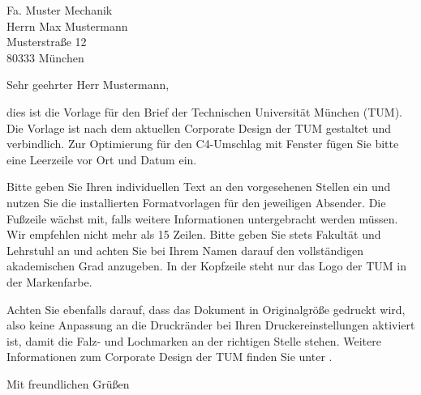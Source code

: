 \documentclass[german]{tumletter}
\begin{document}
\begin{letter}{Fa. Muster Mechanik\\Herrn Max Mustermann\\
    Musterstraße 12\\80333 München}

  \opening{Sehr geehrter Herr Mustermann,}
  \raggedright

  dies ist die Vorlage für den Brief der Technischen Universität München
  (TUM). Die Vorlage ist nach dem aktuellen Corporate Design der TUM gestaltet
  und verbindlich. Zur Optimierung für den C4-Umschlag mit Fenster fügen Sie
  bitte eine Leerzeile vor Ort und Datum ein.

  Bitte geben Sie Ihren individuellen Text an den vorgesehenen Stellen ein und
  nutzen Sie die installierten Formatvorlagen für den jeweiligen Absender. Die
  Fußzeile wächst mit, falls weitere Informationen untergebracht werden
  müssen. Wir empfehlen nicht mehr als 15 Zeilen. Bitte geben Sie stets
  Fakultät und Lehrstuhl an und achten Sie bei Ihrem Namen darauf den
  vollständigen akademischen Grad anzugeben. In der Kopfzeile steht nur das
  Logo der TUM in der Markenfarbe.

  Achten Sie ebenfalls darauf, dass das Dokument in Originalgröße gedruckt
  wird, also keine Anpassung an die Druckränder bei Ihren Druckereinstellungen
  aktiviert ist, damit die Falz- und Lochmarken an der richtigen Stelle
  stehen. Weitere Informationen zum Corporate Design der TUM finden Sie unter
  .

  \closing{Mit freundlichen Grüßen}
\end{letter}
\end{document}
